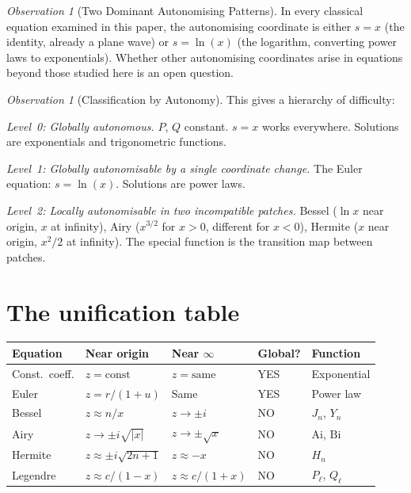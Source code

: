 \documentclass{amsart}
\theoremstyle{definition}
\theoremstyle{remark}
\newtheorem{observation}[theorem]{Observation}
\begin{document}
\begin{observation}[Two Dominant Autonomising Patterns]\label{obs:two-coords}
In every classical equation examined in this paper, the autonomising coordinate is either $s = x$ (the identity, already a plane wave) or $s = \ln(x)$ (the logarithm, converting power laws to exponentials). Whether other autonomising coordinates arise in equations beyond those studied here is an open question.
\end{observation}

\begin{observation}[Classification by Autonomy]\label{obs:classification}
This gives a hierarchy of difficulty:

\emph{Level~0: Globally autonomous.} $P$, $Q$ constant. $s = x$ works everywhere. Solutions are exponentials and trigonometric functions.

\emph{Level~1: Globally autonomisable by a single coordinate change.} The Euler equation: $s = \ln(x)$. Solutions are power laws.

\emph{Level~2: Locally autonomisable in two incompatible patches.} Bessel ($\ln x$ near origin, $x$ at infinity), Airy ($x^{3/2}$ for $x > 0$, different for $x < 0$), Hermite ($x$ near origin, $x^2/2$ at infinity). The special function is the transition map between patches.
\end{observation}

\section{The unification table}

\begin{center}
\begin{tabular}{llllp{3cm}}
\toprule
Equation & Near origin & Near $\infty$ & Global? & Function \\
\midrule
Const.\ coeff. & $z = \text{const}$ & $z = \text{same}$ & YES & Exponential \\
Euler & $z = r/(1{+}u)$ & Same & YES & Power law \\
Bessel & $z \approx n/x$ & $z \to \pm i$ & NO & $J_n$, $Y_n$ \\
Airy & $z \to \pm i\sqrt{|x|}$ & $z \to \pm\sqrt{x}$ & NO & $\mathrm{Ai}$, $\mathrm{Bi}$ \\
Hermite & $z \approx \pm i\sqrt{2n{+}1}$ & $z \approx -x$ & NO & $H_n$ \\
Legendre & $z \approx c/(1{-}x)$ & $z \approx c/(1{+}x)$ & NO & $P_\ell$, $Q_\ell$ \\
\bottomrule
\end{tabular}
\end{center}
\end{document}

